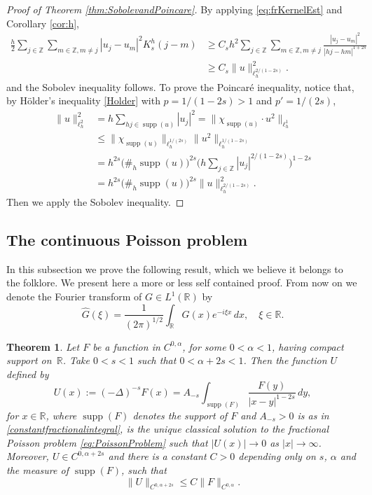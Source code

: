 \documentclass[a4paper,11pt,reqno]{amsart}
\newcommand{\R}{\mathbb{R}}
\newcommand{\Z}{\mathbb{Z}}
\newcommand{\supp}{\operatorname{supp}}
\newtheorem{thm}{Theorem}[section]
\theoremstyle{definition}
\numberwithin{equation}{section}
\begin{document}
\begin{proof}[Proof of Theorem \ref{thm:SobolevandPoincare}]
By applying \eqref{eq:frKernelEst} and Corollary \ref{cor:h},
\begin{align*}
\frac{h}{2}\sum_{j\in\Z}\sum_{m\in\Z,m\neq j}|u_j-u_m|^2K^h_s(j-m)
&\geq C_sh^2\sum_{j\in\Z}\sum_{m\in\Z,m\neq j}\frac{|u_j-u_m|^2}{|hj-hm|^{1+2s}} \\
&\geq C_s\|u\|_{\ell^{2/(1-2s)}_h}^2.
\end{align*}
and the Sobolev inequality follows.
To prove the Poincar\'e inequality,
notice that, by H\"older's inequality \eqref{Holder} with $p=1/(1-2s)>1$ and $p'=1/(2s)$,
\begin{align*}
\|u\|_{\ell^2_h}^2 &=h\sum_{hj\in\supp(u)}|u_j|^2=\|\chi_{\supp(u)}\cdot u^2\|_{\ell^1_h} \\
&\leq \|\chi_{\supp(u)}\|_{\ell^{1/(2s)}_h}\|u^2\|_{\ell^{1/(1-2s)}_h} \\
&= h^{2s}\big(\#_h\supp(u)\big)^{2s}\bigg(h\sum_{j\in\Z}|u_j|^{2/(1-2s)}\bigg)^{1-2s} \\
&= h^{2s}\big(\#_h\supp(u)\big)^{2s}\|u\|_{\ell^{2/(1-2s)}_h}^2.
\end{align*}
Then we apply the Sobolev inequality.
\end{proof}

\subsection{The continuous Poisson problem}
\label{Subsection:Poissonproblem}

In this subsection we prove the following result, which we believe it belongs to the folklore.
We present here a more or less self contained proof.
From now on we denote the Fourier transform of $G\in L^1(\R)$ by
$$
\widehat{G}(\xi)=\frac{1}{(2\pi)^{1/2}}\int_{\R}G(x)e^{-i\xi x}\,dx,\quad\xi\in\R.
$$

\begin{thm}
\label{thm:continuousPoissonproblem}
Let $F$ be a function in $C^{0,\alpha}$, for some $0<\alpha<1$,
having compact support on~$\R$. Take $0<s<1$ such that $0<\alpha+2s<1$.
Then the function $U$ defined by
$$
U(x):=(-\Delta)^{-s}F(x)=A_{-s}\int_{\supp(F)}\frac{F(y)}{|x-y|^{1-2s}}\,dy,
$$
for $x\in\R$, where $\supp(F)$ denotes the support of $F$ and $A_{-s}>0$ is as in \eqref{constantfractionalintegral},
is the unique classical solution to the fractional Poisson problem \eqref{eq:PoissonProblem}
such that $|U(x)|\to0$ as $|x|\to\infty$. Moreover, $U\in C^{0,\alpha+2s}$ and there is a constant
$C>0$ depending only on $s$, $\alpha$ and the measure of $\supp(F)$, such that
\begin{equation}
\label{eq:laregularidaddeU}
\|U\|_{C^{0,\alpha+2s}}\leq C\|F\|_{C^{0,\alpha}}.
\end{equation}
\end{thm}
\end{document}
